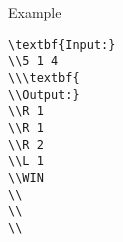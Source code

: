 Example
\begin{verbatim}
\textbf{Input:}
\\5 1 4
\\\textbf{
\\Output:}
\\R 1
\\R 1
\\R 2
\\L 1
\\WIN
\\
\\
\\\end{verbatim}